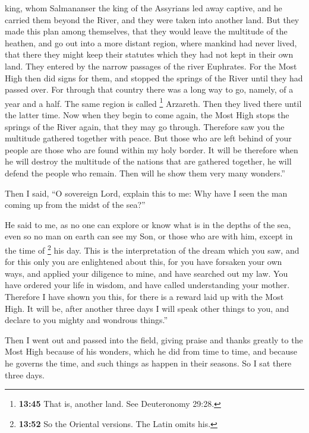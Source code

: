 king, whom Salmananser the king of the Assyrians led away captive, and
he carried them beyond the River, and they were taken into another land.
 But they made this plan among themselves, that they
would leave the multitude of the heathen, and go out into a more distant
region, where mankind had never lived,  that there they
might keep their statutes which they had not kept in their own land.
 They entered by the narrow passages of the river
Euphrates.  For the Most High then did signs for them,
and stopped the springs of the River until they had passed over.
 For through that country there was a long way to go,
namely, of a year and a half. The same region is called \footnote{\textbf{13:45}
  That is, another land. See Deuteronomy 29:28.} Arzareth.
 Then they lived there until the latter time. Now when
they begin to come again,  the Most High stops the
springs of the River again, that they may go through. Therefore saw you
the multitude gathered together with peace.  But those
who are left behind of your people are those who are found within my
holy border.  It will be therefore when he will destroy
the multitude of the nations that are gathered together, he will defend
the people who remain.  Then will he show them very many
wonders.''

 Then I said, ``O sovereign Lord, explain this to me: Why
have I seen the man coming up from the midst of the sea?''

 He said to me, as no one can explore or know what is in
the depths of the sea, even so no man on earth can see my Son, or those
who are with him, except in the time of \footnote{\textbf{13:52} So the
  Oriental versions. The Latin omits his.} his day.  This
is the interpretation of the dream which you saw, and for this only you
are enlightened about this,  for you have forsaken your
own ways, and applied your diligence to mine, and have searched out my
law.  You have ordered your life in wisdom, and have
called understanding your mother.  Therefore I have shown
you this, for there is a reward laid up with the Most High. It will be,
after another three days I will speak other things to you, and declare
to you mighty and wondrous things.''

 Then I went out and passed into the field, giving praise
and thanks greatly to the Most High because of his wonders, which he did
from time to time,  and because he governs the time, and
such things as happen in their seasons. So I sat there three days.

